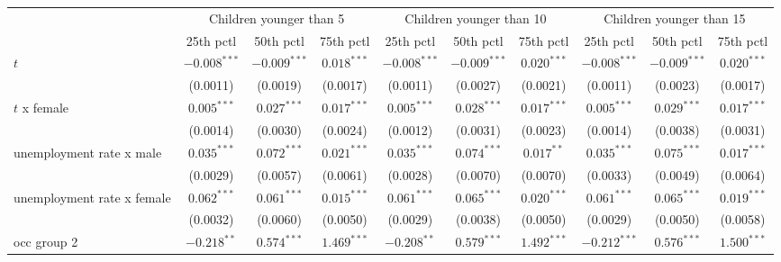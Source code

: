 \begin{tabular}{l|ccc|ccc|ccc}
\toprule
{} & \multicolumn{3}{c}{Children younger than 5} & \multicolumn{3}{c}{Children younger than 10} & \multicolumn{3}{c}{Children younger than 15} \\
{} &               25th pctl &       50th pctl &       75th pctl &                25th pctl &       50th pctl &       75th pctl &                25th pctl &       50th pctl &       75th pctl \\
\midrule
$t$                        &          $-0.008^{***}$ &  $-0.009^{***}$ &   $0.018^{***}$ &           $-0.008^{***}$ &  $-0.009^{***}$ &   $0.020^{***}$ &           $-0.008^{***}$ &  $-0.009^{***}$ &   $0.020^{***}$ \\
                           &                (0.0011) &        (0.0019) &        (0.0017) &                 (0.0011) &        (0.0027) &        (0.0021) &                 (0.0011) &        (0.0023) &        (0.0017) \\
$t$ x female               &           $0.005^{***}$ &   $0.027^{***}$ &   $0.017^{***}$ &            $0.005^{***}$ &   $0.028^{***}$ &   $0.017^{***}$ &            $0.005^{***}$ &   $0.029^{***}$ &   $0.017^{***}$ \\
                           &                (0.0014) &        (0.0030) &        (0.0024) &                 (0.0012) &        (0.0031) &        (0.0023) &                 (0.0014) &        (0.0038) &        (0.0031) \\
unemployment rate x male   &           $0.035^{***}$ &   $0.072^{***}$ &   $0.021^{***}$ &            $0.035^{***}$ &   $0.074^{***}$ &    $0.017^{**}$ &            $0.035^{***}$ &   $0.075^{***}$ &   $0.017^{***}$ \\
                           &                (0.0029) &        (0.0057) &        (0.0061) &                 (0.0028) &        (0.0070) &        (0.0070) &                 (0.0033) &        (0.0049) &        (0.0064) \\
unemployment rate x female &           $0.062^{***}$ &   $0.061^{***}$ &   $0.015^{***}$ &            $0.061^{***}$ &   $0.065^{***}$ &   $0.020^{***}$ &            $0.061^{***}$ &   $0.065^{***}$ &   $0.019^{***}$ \\
                           &                (0.0032) &        (0.0060) &        (0.0050) &                 (0.0029) &        (0.0038) &        (0.0050) &                 (0.0029) &        (0.0050) &        (0.0058) \\
occ group 2                &           $-0.218^{**}$ &   $0.574^{***}$ &   $1.469^{***}$ &            $-0.208^{**}$ &   $0.579^{***}$ &   $1.492^{***}$ &           $-0.212^{***}$ &   $0.576^{***}$ &   $1.500^{***}$ \\

\end{tabular}
